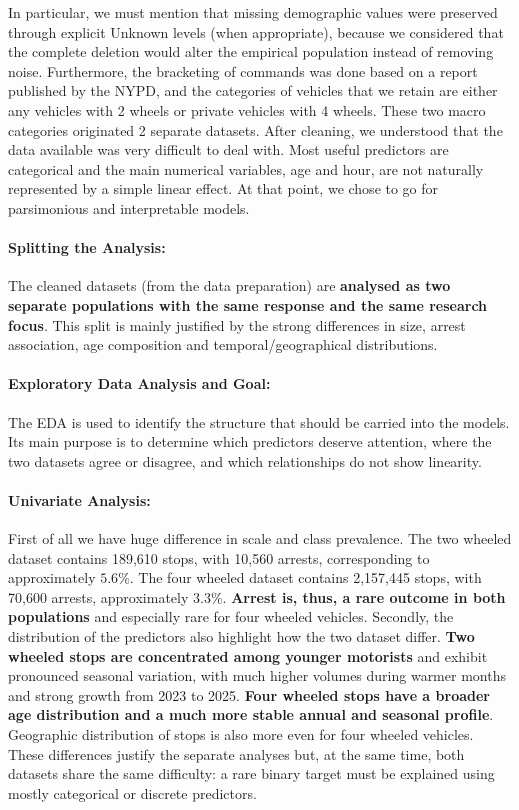 In particular, we must mention that missing demographic values were preserved through explicit Unknown levels (when appropriate), because we considered that the complete deletion would alter the empirical population instead of removing noise. Furthermore, the bracketing of commands was done based on a report published by the NYPD, and the categories of vehicles that we retain are either any vehicles with 2 wheels or private vehicles with 4 wheels. These two macro categories originated 2 separate datasets.
After cleaning, we understood that the data available was very difficult to deal with. Most useful predictors are categorical and the main numerical variables, age and hour, are not naturally represented by a simple linear effect. At that point, we chose to go for parsimonious and interpretable models.

\paragraph{Splitting the Analysis:} The cleaned datasets (from the data preparation) are \textbf{analysed as two separate populations with the same response and the same research focus}. This split is mainly justified by the strong differences in size, arrest association, age composition and temporal/geographical distributions.

\paragraph{Exploratory Data Analysis and Goal:} The EDA is used to identify the structure that should be carried into the models. Its main purpose is to determine which predictors deserve attention, where the two datasets agree or disagree, and which relationships do not show linearity.

\paragraph{Univariate Analysis:} First of all we have huge difference in scale and class prevalence. The two wheeled dataset contains 189,610 stops, with 10,560 arrests, corresponding to approximately $5.6\%$. The four wheeled dataset contains 2,157,445 stops, with 70,600 arrests, approximately $3.3\%$. \textbf{Arrest is, thus, a rare outcome in both populations} and especially rare for four wheeled vehicles. Secondly, the distribution of the predictors also highlight how the two dataset differ. \textbf{Two wheeled stops are concentrated among younger motorists} and exhibit pronounced seasonal variation, with much higher volumes during warmer months and strong growth from 2023 to 2025. \textbf{Four wheeled stops have a broader age distribution and a much more stable annual and seasonal profile}. Geographic distribution of stops is also more even for four wheeled vehicles.
These differences justify the separate analyses but, at the same time, both datasets share the same difficulty: a rare binary target must be explained using mostly categorical or discrete predictors.

